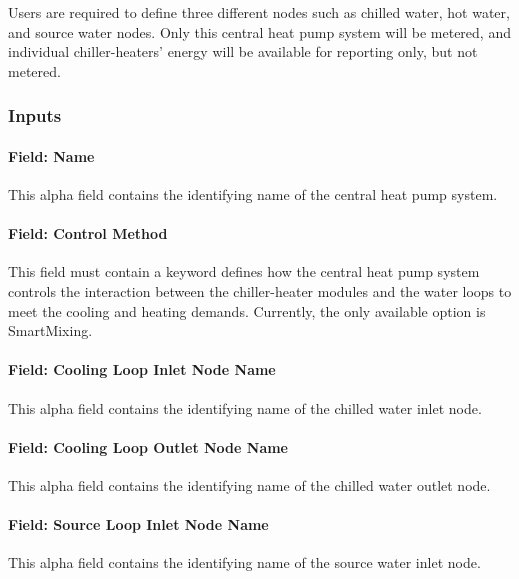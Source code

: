 Users are required to define three different nodes such as chilled water, hot water, and source water nodes. Only this central heat pump system will be metered, and individual chiller-heaters' energy will be available for reporting only, but not metered.

\subsubsection{Inputs}\label{inputs-19-004}

\paragraph{Field: Name}\label{field-name-18-005}

This alpha field contains the identifying name of the central heat pump system.

\paragraph{Field: Control Method}\label{field-control-method}

This field must contain a keyword defines how the central heat pump system controls the interaction between the chiller-heater modules and the water loops to meet the cooling and heating demands. Currently, the only available option is SmartMixing.

\paragraph{Field: Cooling Loop Inlet Node Name}\label{field-cooling-loop-inlet-node-name}

This alpha field contains the identifying name of the chilled water inlet node.

\paragraph{Field: Cooling Loop Outlet Node Name}\label{field-cooling-loop-outlet-node-name}

This alpha field contains the identifying name of the chilled water outlet node.

\paragraph{Field: Source Loop Inlet Node Name}\label{field-source-loop-inlet-node-name}

This alpha field contains the identifying name of the source water inlet node.

